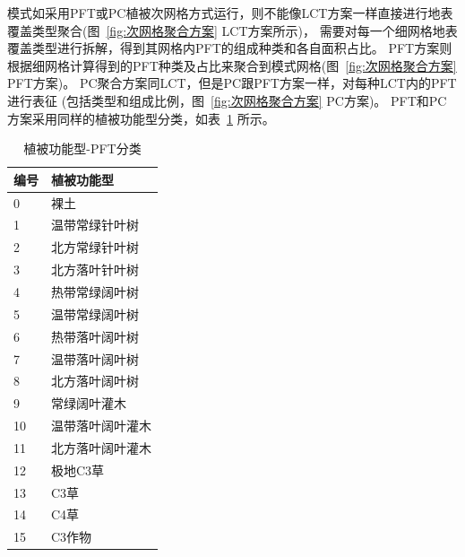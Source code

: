 模式如采用PFT或PC植被次网格方式运行，则不能像LCT方案一样直接进行地表覆盖类型聚合(图~\ref{fig:次网格聚合方案} LCT方案所示)，
需要对每一个细网格地表覆盖类型进行拆解，得到其网格内PFT的组成种类和各自面积占比。
PFT方案则根据细网格计算得到的PFT种类及占比来聚合到模式网格(图~\ref{fig:次网格聚合方案} PFT方案)。
PC聚合方案同LCT，但是PC跟PFT方案一样，对每种LCT内的PFT进行表征 (包括类型和组成比例，图~\ref{fig:次网格聚合方案} PC方案)。
PFT和PC方案采用同样的植被功能型分类，如表~\ref{tab:PFT分类} 所示。
\begin{table}[htbp]
  \centering
  \caption{植被功能型-PFT分类}
  \label{tab:PFT分类}
  \begin{tabular}{ll}
    \toprule
    \multicolumn{1}{l}{编号} & \multicolumn{1}{l}{植被功能型} \\ \midrule
    0                        & 裸土                           \\
    1                        & 温带常绿针叶树                 \\
    2                        & 北方常绿针叶树                 \\
    3                        & 北方落叶针叶树                 \\
    4                        & 热带常绿阔叶树                 \\
    5                        & 温带常绿阔叶树                 \\
    6                        & 热带落叶阔叶树                 \\
    7                        & 温带落叶阔叶树                 \\
    8                        & 北方落叶阔叶树                 \\
    9                        & 常绿阔叶灌木                   \\
    10                       & 温带落叶阔叶灌木               \\
    11                       & 北方落叶阔叶灌木               \\
    12                       & 极地C3草                       \\
    13                       & C3草                           \\
    14                       & C4草                           \\
    15                       & C3作物                         \\ \bottomrule
  \end{tabular}
\end{table}

